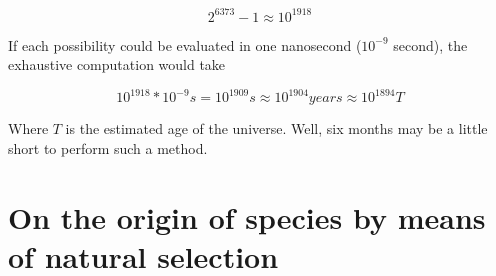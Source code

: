 \documentclass{report}
\begin{document}
		\begin{equation}
			2^{6373} - 1 \approx 10^{1918}
		\end{equation}
		
		If each possibility could be evaluated in one nanosecond ($10^{-9}$ second), the exhaustive computation would take 
		
		\begin{equation}
			10^{1918} * 10^{-9} s = 10^{1909} s \approx 10^{1904} years \approx 10^{1894} T
		\end{equation}
		
		Where $T$ is the estimated age of the universe. Well, six months may be a little short to perform such a method.
		
		\section{On the origin of species by means of natural selection}
		
\end{document}
